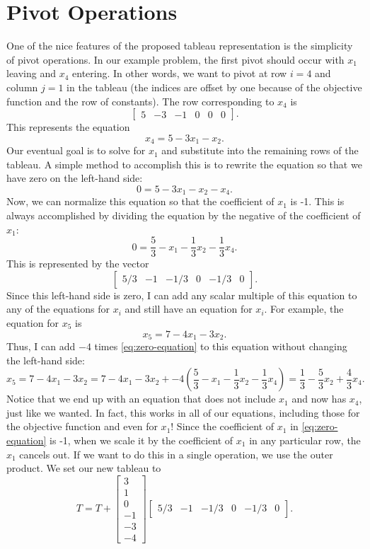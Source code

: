 \section*{Pivot Operations}

One of the nice features of the proposed tableau representation is the simplicity of pivot operations.
In our example problem, the first pivot should occur with $x_1$ leaving and $x_4$ entering.
In other words, we want to pivot at row $i = 4$ and column $j = 1$ in the tableau (the indices are offset by one because of the objective function and the row of constants).
The row corresponding to $x_4$ is
\[
\begin{bmatrix} 5 &-3 &-1 & 0 & 0 & 0\end{bmatrix}.
\]
This represents the equation
\[
	x_4 = 5 - 3x_1 - x_2.
\]
Our eventual goal is to solve for $x_1$ and substitute into the remaining rows of the tableau.
A simple method to accomplish this is to rewrite the equation so that we have zero on the left-hand side:
\[
	0 = 5 - 3x_1 - x_2 - x_4.
\]
Now, we can normalize this equation so that the coefficient of $x_1$ is -1.
This is always accomplished by dividing the equation by the negative of the coefficient of $x_1$:
\begin{equation}\label{eq:zero-equation}
	0 = \frac{5}{3} - x_1 - \frac{1}{3}x_2 - \frac{1}{3}x_4.
\end{equation}
This is represented by the vector
\[
	\begin{bmatrix} 5/3 & -1 & -1/3 & 0 & -1/3 & 0\end{bmatrix}.
\]
Since this left-hand side is zero, I can add any scalar multiple of this equation to any of the equations for $x_i$ and still have an equation for $x_i$.
For example, the equation for $x_5$ is
\[
	x_5 = 7 - 4x_1 - 3x_2.
\]
Thus, I can add $-4$ times \eqref{eq:zero-equation} to this equation without changing the left-hand side:
\[ x_5 = 7 - 4x_1 - 3x_2 = 7 - 4x_1 - 3x_2 + -4\left(\frac{5}{3} - x_1 - \frac{1}{3}x_2 - \frac{1}{3}x_4\right) = \frac{1}{3} - \frac{5}{3}x_2 + \frac{4}{3} x_4.
\]
Notice that we end up with an equation that does not include $x_1$ and now has $x_4$, just like we wanted.
In fact, this works in all of our equations, including those for the objective function and even for $x_1$!
Since the coefficient of $x_1$ in \eqref{eq:zero-equation} is -1, when we scale it by the coefficient of $x_1$ in any particular row, the $x_1$ cancels out.
If we want to do this in a single operation, we use the outer product.
We set our new tableau to
\[
	T = T + \begin{bmatrix}3 \\ 1 \\ 0 \\ -1 \\ -3 \\ -4\end{bmatrix}\begin{bmatrix} 5/3 & -1 & -1/3 & 0 & -1/3 & 0\end{bmatrix}.
\]
